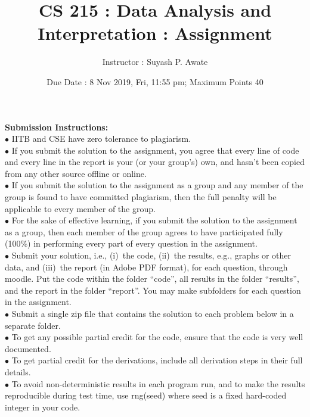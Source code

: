 \documentclass[11pt]{article}
\title {CS 215 : Data Analysis and Interpretation : Assignment}
\author {Instructor : Suyash P. Awate}
\date {Due Date : 8 Nov 2019, Fri, 11:55 pm; Maximum Points 40}
\begin{document}
\maketitle

\setlength{\parindent}{0cm}

{\bf Submission Instructions: } \\

$\bullet$ IITB and CSE have zero tolerance to plagiarism. \\

$\bullet$ If you submit the solution to the assignment, you agree that every line of code and every line in the report is your (or your group's) own,
and hasn't been copied from any other source offline or online. \\

$\bullet$ If you submit the solution to the assignment as a group and any member of the group is found to have committed plagiarism, then the full
penalty will be applicable to every member of the group. \\

$\bullet$ For the sake of effective learning, if you submit the solution to the assignment as a group, then each member of the group agrees to have
participated fully (100\%) in performing every part of every question in the assignment. \\

$\bullet$ Submit your solution, i.e., (i)~the code, (ii)~the results, e.g., graphs or other data, and (iii)~the report (in Adobe PDF format), for each
question, through moodle. Put the code within the folder ``code'', all results in the folder ``results'', and the report in the folder ``report''. You
may make subfolders for each question in the assignment. \\

$\bullet$ Submit a single zip file that contains the solution to each problem below in a separate folder. \\

$\bullet$ To get any possible partial credit for the code, ensure that the code is very well documented. \\

$\bullet$ To get partial credit for the derivations, include all derivation steps in their full details. \\

$\bullet$ To avoid non-deterministic results in each program run, and to make the results reproducible during test time, use rng(seed) where seed is a
fixed hard-coded integer in your code. \\
\end{document}
